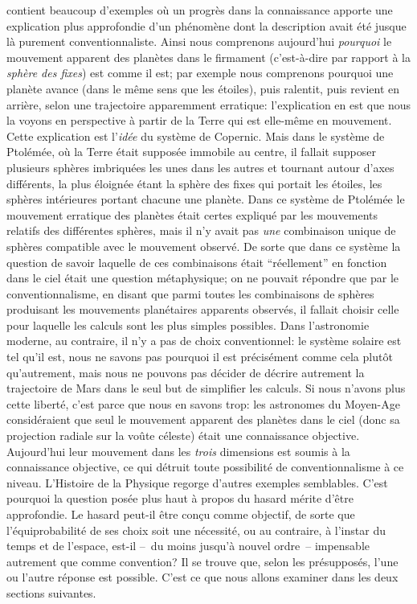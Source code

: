 contient beaucoup d'exemples o\`u un progr\`es dans la connaissance 
apporte une explication plus approfondie d'un ph\'enom\`ene dont la 
description avait \'et\'e jusque l\`a purement conventionnaliste. 
Ainsi nous comprenons aujourd'hui {\it pourquoi} le mouvement 
apparent des plan\`etes dans le firmament (c'est-\`a-dire par rapport 
\`a la {\it sph\`ere des fixes}) est comme il est; par exemple nous 
comprenons pourquoi une plan\`ete avance (dans le m\^eme sens que 
les \'etoiles), puis ralentit, puis revient en arri\`ere, selon une 
trajectoire apparemment erratique: l'explication en est que nous la 
voyons en perspective \`a partir de la Terre qui est elle-m\^eme en 
mouvement.  
\medskip 
Cette explication est l'{\it id\'ee} du syst\`eme de Copernic. Mais dans le 
syst\`eme de Ptol\'em\'ee, o\`u la Terre \'etait suppos\'ee immobile au 
centre, il fallait supposer plusieurs sph\`eres imbriqu\'ees les unes dans 
les autres et tournant autour d'axes diff\'erents, la plus \'eloign\'ee 
\'etant la sph\`ere des fixes qui portait les \'etoiles, les sph\`eres 
int\'erieures portant chacune une plan\`ete. Dans ce syst\`eme de 
Ptol\'em\'ee le mouvement erratique des plan\`etes \'etait certes 
expliqu\'e par les mouvements relatifs des diff\'erentes sph\`eres, mais 
il n'y avait pas {\it une} combinaison unique de sph\`eres compatible avec 
le mouvement observ\'e. De sorte que dans ce syst\`eme la question de 
savoir  laquelle de ces combinaisons \'etait ``r\'eellement'' en fonction 
dans le ciel \'etait une question m\'etaphysique; on ne pouvait r\'epondre 
que par le conventionnalisme, en disant que parmi toutes les 
combinaisons de sph\`eres produisant les mouvements plan\'etaires 
apparents observ\'es, il fallait choisir celle pour laquelle les calculs 
sont les plus simples possibles.  Dans l'astronomie mo\-derne, au 
contraire, il n'y a pas de choix conventionnel: le syst\`eme solaire est 
tel qu'il est, nous ne savons pas pourquoi il est pr\'ecis\'ement 
comme cela plut\^ot qu'autrement, mais nous ne pouvons pas 
d\'ecider de d\'ecrire autrement la trajectoire de Mars dans le seul 
but de simplifier les calculs. Si  nous n'avons plus cette libert\'e, 
c'est parce que nous en savons trop: les  astronomes du Moyen-Age 
consid\'eraient que seul le mouvement apparent des plan\`etes dans 
le ciel (donc sa projection radiale sur la vo\^ute c\'eleste) \'etait une 
connaissance objective.  Aujourd'hui leur mouvement dans les {\it 
trois} dimensions est soumis \`a la connaissance objective, ce qui 
d\'etruit toute possibilit\'e de conventionnalisme \`a ce niveau.  
L'Histoire de la Physique regorge d'autres exemples semblables.  
\medskip 
C'est pourquoi la question pos\'ee plus haut \`a propos du hasard 
m\'erite d'\^etre approfondie. Le hasard peut-il \^etre con\c cu  
comme objectif, de sorte que l'\'equiprobabilit\'e de ses choix soit 
une n\'ecessit\'e, ou au contraire, \`a l'instar du temps et de l'espace, 
est-il --~du moins jusqu'\`a nouvel ordre~-- impensable autrement 
que comme convention? 
\medskip 
Il se trouve que, selon les pr\'esuppos\'es, l'une ou l'autre r\'eponse est 
possible. C'est ce que nous allons examiner dans les deux sections 
suivantes. 
 
